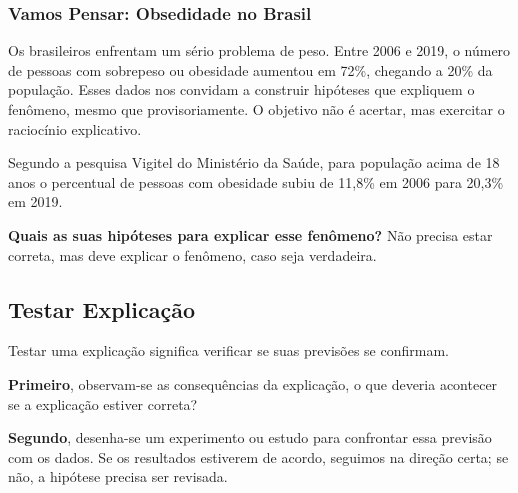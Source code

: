 \documentclass[
  letterpaper,
  DIV=11,
  numbers=noendperiod]{scrreprt}
\begin{document}
\subsubsection{Vamos Pensar: Obsedidade no
Brasil}\label{vamos-pensar-obsedidade-no-brasil}

Os brasileiros enfrentam um sério problema de peso. Entre 2006 e 2019, o
número de pessoas com sobrepeso ou obesidade aumentou em 72\%, chegando
a 20\% da população. Esses dados nos convidam a construir hipóteses que
expliquem o fenômeno, mesmo que provisoriamente. O objetivo não é
acertar, mas exercitar o raciocínio explicativo.

\begin{tcolorbox}[enhanced jigsaw, leftrule=.75mm, coltitle=black, colframe=quarto-callout-warning-color-frame, toprule=.15mm, opacitybacktitle=0.6, bottomtitle=1mm, bottomrule=.15mm, titlerule=0mm, toptitle=1mm, title=\textcolor{quarto-callout-warning-color}{\faExclamationTriangle}\hspace{0.5em}{Fatos e Observações}, arc=.35mm, breakable, opacityback=0, colbacktitle=quarto-callout-warning-color!10!white, colback=white, left=2mm, rightrule=.15mm]

Segundo a pesquisa Vigitel do Ministério da Saúde, para população acima
de 18 anos o percentual de pessoas com obesidade subiu de 11,8\% em 2006
para 20,3\% em 2019.

\end{tcolorbox}

\textbf{Quais as suas hipóteses para explicar esse fenômeno?} Não
precisa estar correta, mas deve explicar o fenômeno, caso seja
verdadeira.

\subsection{Testar Explicação}\label{testar-explicauxe7uxe3o}

Testar uma explicação significa verificar se suas previsões se
confirmam.

\textbf{Primeiro}, observam-se as consequências da explicação, o que
deveria acontecer se a explicação estiver correta?

\textbf{Segundo}, desenha-se um experimento ou estudo para confrontar
essa previsão com os dados. Se os resultados estiverem de acordo,
seguimos na direção certa; se não, a hipótese precisa ser revisada.
\end{document}
